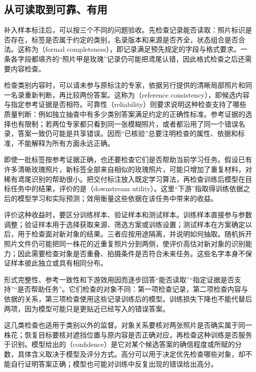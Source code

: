 \subsection{从可读取到可靠、有用}
\label{sec:knowledge-acquisition-acceptance}

补入样本标注后，可以按三个不同的问题验收。先检查记录能否读取：照片标识是否存在，标签是否属于约定的类别，名录版本和来源是否齐全，状态组合是否合法。这称为（formal completeness），即记录满足预先规定的字段与格式要求。一条各字段都填齐的“照片甲是玫瑰”记录仍可能把鸢尾认错，因此格式检查之后还需要内容检查。

检查类别内容时，可以请未参与原标注的专家，依据另行提供的清晰局部照片和同一名录重新判断，再比较两份答案。这称为（reference consistency），即候选内容与指定参考证据是否相符。可靠性（reliability）则要求说明这种检查支持了哪些质量判断：例如独立抽查中有多少类别答案满足约定的正确性标准。参考证据的选择也有限制；若两位专家都只看到同一张模糊照片，或者都沿用了同一个错误名录，答案一致仍可能是共享错误。因而“已核验”总要注明检查的属性、依据和标准，不能解释为所有方面永远正确。

即使一批标签按参考证据正确，也还要检查它们是否帮助当前学习任务。假设已有许多清晰玫瑰照片，新标签全部来自相似的玫瑰照片，可能只增加了重复材料，对稀有鸢尾识别的帮助很小。把交付标注放入既定学习算法，再检查训练后模型在目标任务中的结果，评价的是（downstream utility）。这里“下游”指取得训练依据之后的模型学习和实际预测；效用衡量这些依据在该任务中带来的收益。

评价这种收益时，要区分训练样本、验证样本和测试样本。训练样本直接参与参数调整；验证样本用于选择获取来源、筛选方案或训练设置；测试样本在方案确定以后，用于检查面对新对象的结果。三者应按用途隔离，并说明如何抽取。随机拆开照片文件仍可能把同一株花的近重复照片分到两侧，使评价高估对新对象的识别能力；因此需要检查对象是否重叠、拍摄条件是否符合未来任务。这些名字本身不保证样本彼此独立或具有相同分布。

形式完整性、参考一致性和下游效用因而逐步回答“能否读取”“指定证据是否支持”“是否帮助任务”。它们检查的对象不同：第一项检查记录，第二项检查内容与依据的关系，第三项检查使用这些记录训练后的模型。训练损失下降也不能代替后两项，因为模型可能只是更贴近已经写入的错误答案。

这几类检查也适用于类别以外的监督。对象关系要核对两张照片是否确实属于同一株花；恢复目标要核对遮挡位置与原内容是否正确对应，再检查这种训练是否服务于识别。模型给出的（confidence）是它对某个候选答案的确信程度或所赋的分数，具体含义取决于模型及评分方式。高分可以用于决定优先检查哪些对象，却不能自行证明答案正确；模型也可能对训练中反复出现的错误给出高分。

